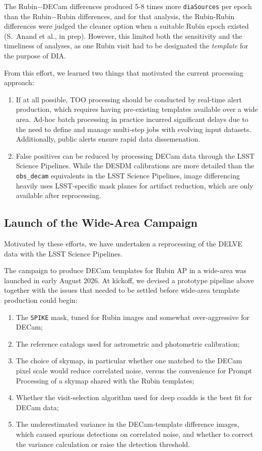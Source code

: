 The Rubin$-$DECam differences produced 5-8 times more \texttt{diaSources} per epoch than the Rubin$-$Rubin differences, and for that analysis, the Rubin-Rubin differences were judged the cleaner option when a suitable Rubin epoch existed (S.\ Anand et al., in prep). 
However, this limited both the sensitivity and the timeliness of analyses, as one Rubin visit had to be designated the \textit{template} for the purpose of DIA.

From this effort, we learned two things that motivated the current processing approach: 
\begin{enumerate}
\item If at all possible, TOO processing should be conducted by real-time alert production, which requires having pre-existing templates available over a wide area.  Ad-hoc batch processing in practice incurred significant delays due to the need to define and manage multi-step jobs with evolving input datasets.  Additionally, public alerts ensure rapid data dissemenation.
\item False positives can be reduced by processing DECam data through the LSST Science Pipelines.  While the DESDM calibrations are more detailed than the \texttt{obs\_decam} equivalents in the LSST Science Pipelines, image differencing heavily uses LSST-specific mask planes for artifact reduction, which are only available after reprocessing.
\end{enumerate}

\subsection{Launch of the Wide-Area Campaign}

Motivated by these efforts, we have undertaken a reprocessing of the DELVE data with the LSST Science Pipelines.
 
The campaign to produce DECam templates for Rubin AP in a wide-area was launched in early August 2026. At kickoff, we devised a prototype pipeline above together with the issues that needed to be settled before wide-area template production could begin:
\begin{enumerate}
  \item The \texttt{SPIKE} mask, tuned for Rubin images and somewhat over-aggressive for DECam;
  \item The reference catalogs used for astrometric and photometric calibration;
  \item The choice of skymap, in particular whether one matched to the DECam pixel scale would reduce correlated noise, versus the convenience for Prompt Processing of a skymap shared with the Rubin templates;
  \item Whether the visit-selection algorithm used for deep coadds is the best fit for DECam data;
  \item The underestimated variance in the DECam-template difference images, which caused spurious detections on correlated noise, and whether to correct the variance calculation or raise the detection threshold.
\end{enumerate}
 

